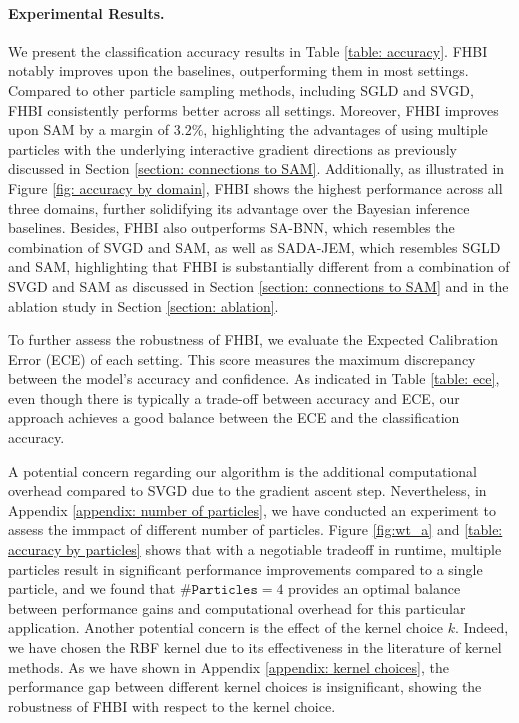 \paragraph{Experimental Results.} We present the classification accuracy results in Table \ref{table: accuracy}. FHBI notably improves upon the baselines, outperforming them in most settings. Compared to other particle sampling methods, including SGLD and SVGD, FHBI consistently performs better across all settings. Moreover, FHBI improves upon SAM by a margin of $3.2 \%$, highlighting the advantages of using multiple particles with the underlying interactive gradient directions as previously discussed in Section \ref{section: connections to SAM}. Additionally, as illustrated in Figure \ref{fig: accuracy by domain}, FHBI shows the highest performance across all three domains, further solidifying its advantage over the Bayesian inference baselines. Besides, FHBI also outperforms SA-BNN, which resembles the combination of SVGD and SAM, as well as SADA-JEM, which resembles SGLD and SAM, highlighting that FHBI is substantially different from a combination of SVGD and SAM as discussed in Section \ref{section: connections to SAM} and in the ablation study in Section \ref{section: ablation}.




To further assess the robustness of FHBI, we evaluate the Expected Calibration Error (ECE) of each setting. This score measures the maximum discrepancy between the model's accuracy and confidence. As indicated in Table \ref{table: ece}, even though there is typically a trade-off between accuracy and ECE, our approach achieves a good balance between the ECE and the classification accuracy. 

A potential concern regarding our algorithm is the additional computational overhead compared to SVGD due to the gradient ascent step. Nevertheless, in Appendix \ref{appendix: number of particles}, we have conducted an experiment to assess the immpact of different number of particles. Figure \ref{fig:wt_a} and \ref{table: accuracy by particles} shows that with a negotiable tradeoff in runtime, multiple particles result in significant performance improvements compared to a single particle, and we found that $\texttt{\#Particles} = 4$ provides an optimal balance between performance gains and computational overhead for this particular application. Another potential concern is the effect of the kernel choice $k$. Indeed, we have chosen the RBF kernel due to its effectiveness in the literature of kernel methods. As we have shown in Appendix \ref{appendix: kernel choices}, the performance gap between different kernel choices is insignificant, showing the robustness of FHBI with respect to the kernel choice.  
